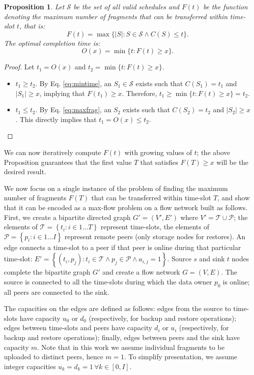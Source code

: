 \documentclass[conference,10pt]{IEEEtran}
\newtheorem{proposition}{Proposition}
\newtheorem{proof}{Proof}
\begin{document}
\begin{proposition}
	Let $\mathcal S$ be the set of all valid schedules and $F(t)$ be the function denoting the maximum number of fragments that can be transferred within time-slot $t$, that is: 
	\begin{equation}
		F(t)=\max\{|S| : S \in \mathcal S \land C(S) \leq t\}. \label{eq:maxfrag} 
	\end{equation}
	The optimal completion time is: $$O(x)=\min\{t : F(t) \geq x\}.$$ 
\end{proposition}
\begin{proof}
	Let $t_1=O(x)$ and $t_2=\min\{ t: F(t) \geq x\}$. 
	\begin{itemize}
		\item $t_1 \geq t_2$. By Eq. \ref{eq:mintime}, an $S_1 \in \mathcal S$ exists such that $C(S_1)=t_1$ and $|S_1| \geq x$, implying that $F(t_1) \geq x$. Therefore, $t_1 \geq \min\{t: F(t) \geq x \}=t_2$.
		
		\item $t_1 \leq t_2$. By Eq. \ref{eq:maxfrag}, an $S_2$ exists such that $C(S_2)=t_2$ and $|S_2| \geq x$. This directly implies that $t_1 = O(x) \leq t_2$. 
	\end{itemize}
\end{proof}

We can now iteratively compute $F(t)$ with growing values of $t$; the
above Proposition guarantees that the first value $T$ that satisfies
$F(T) \geq x$ will be the desired result.

We now focus on a single instance of the problem of finding the
maximum number of fragments $F(T)$ that can be transferred within
time-slot $T$, and show that it can be encoded as a max-flow problem
on a flow network built as follows.  First, we create a bipartite
directed graph $G'=(V',E')$ where $V'=\mathcal{T} \cup \mathcal{P}$;
the elements of $\mathcal{T}=\left\{t_i : i \in 1\ldots T\right\}$
represent time-slots, the elements of $\mathcal{P}=\left\{p_i : i \in
1 \ldots I\right\}$ represent remote peers (only storage nodes for
restores). An edge connects a time-slot to a peer if that peer is
online during that particular time-slot: $E'
= \left\{\left(t_i,p_j\right): t_i \in \mathcal T \land
p_j \in \mathcal P \land a_{i,j}=1\right\}$. Source $s$ and sink $t$
nodes complete the bipartite graph $G'$ and create a flow network
$G=(V,E)$. The source is connected to all the time-slots during which
the data owner $p_0$ is online; all peers are connected to the sink.

The capacities on the edges are defined as follows: edges from the source to time-slots have capacity $u_0$ or $d_0$ (respectively, for backup and restore operations); edges between time-slots and peers have capacity $d_i$ or $u_i$ (respectively, for backup and restore operations); finally, edges between peers and the sink have capacity $m$. Note that in this work we assume individual fragments to be uploaded to distinct peers, hence $m=1$. To simplify presentation, we assume integer capacities $u_k=d_k=1\, \forall k \in [0,I]$.
\end{document}
